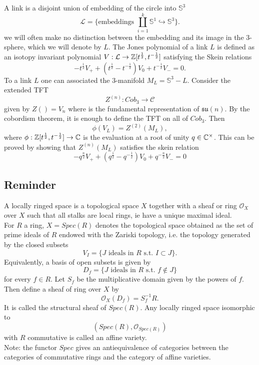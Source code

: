 A link is a disjoint union of embedding of the circle into $\mathbb S^3$
\[\mathcal L = \{ \text{embeddings }\coprod_{i=1}^k \mathbb S^1 \hookrightarrow \mathbb S^3 \}.\]
we will often make no distinction between the embedding and its image in the $3$-sphere, which we will denote by $L$. The Jones polynomial of a link $L$ is defined as an isotopy invariant polynomial $V : \mathcal L \rightarrow \mathbb Z [t^{\frac{1}{2}},t^{-\frac{1}{2}}]$ satisfying the Skein relations
\[-t^{\frac{1}{2}} V_+ + (t^{\frac{1}{2}} - t^{-\frac{1}{2}})V_0 + t^{-\frac{1}{2}}V_- = 0.\]
To a link $L$ one can associated the $3$-manifold $M_L= \mathbb S^3 - L$. Consider the extended TFT 
\[ Z^{(n)} : Cob_{3} \rightarrow \mathcal C\] given by $Z()=V_n$ where is the fundamental representation of $\mathfrak{su}(n)$. By the cobordism theorem, it is enough to define the TFT on all of $Cob_3$. Then
\[ \phi(V_L) = Z^{(2)}(M_L),\]
where $\phi : \mathbb Z [t^{\frac{1}{2}},t^{-\frac{1}{2}}] \rightarrow \mathbb C$ is the evaluation at a root of unity $q\in \mathbb C^\times$. This can be proved by showing that $Z^{(n)}(M_L)$ satisfies the skein relation \[-q^{\frac{n}{2}} V_+ + (q^{\frac{1}{2}} - q^{-\frac{1}{2}})V_0 + q^{-\frac{n}{2}}V_- = 0\]

\subsection{Reminder}

A locally ringed space is a topological space $X$ together with a sheaf or ring $\mathcal O_X$ over $X$ such that all stalks are local rings, ie have a unique maximal ideal.\\

For $R$ a ring, $X=Spec(R)$ denotes the topological space obtained as the set of prime ideals of $R$ endowed with the Zariski topology, i.e. the topology generated by the closed subsets
\[V_I = \{J \text{ ideals in } R \text{ s.t. } I \subset J \}.\]
Equivalently, a basis of open subsets is given by \[D_f = \{ J \text{ ideals in } R \text{ s.t. } f\notin J  \}\]
for every $f\in R$. Let $S_f$ be the multiplicative domain given by the powers of $f$. Then define a sheaf of ring over $X$ by
\[\mathcal O_X(D_f)   = S_f^{-1}R.\]
It is called the structural sheaf of $Spec(R)$. Any locally ringed space isomorphic to 
\[(Spec(R),\mathcal O_{Spec(R)})\] 
with $R$ commutative is called an affine variety.\\

Note: the functor $Spec$ gives an antiequivalence of categories between the categories of commutative rings and the category of affine varieties. 

